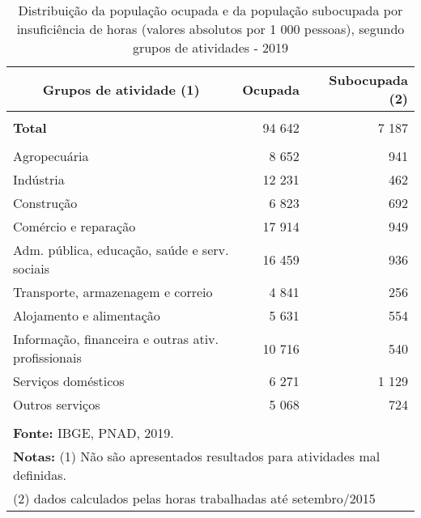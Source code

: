\documentclass[12pt]{article}   %
\begin{document}
	\begin{table}[h!]
		\centering
		\caption{Distribuição da população ocupada e da população subocupada por insuficiência de horas (valores absolutos por 1 000 pessoas), segundo grupos de atividades - 2019}
		\label{tab_ocup}
		\begin{tabular}{l|rr}
			\hline
			\multicolumn{1}{c|}{\textbf{Grupos de atividade (1)}}&\textbf{Ocupada}&\textbf{Subocupada (2)}\\
			\hline
			&&\\
			\textbf{Total}&94 642&7 187\\
			&&\\
			Agropecuária&8 652&941\\
			Indústria&12 231&462\\
			Construção&6 823&692\\
			Comércio e reparação&17 914&949\\
			Adm. pública, educação, saúde e serv. sociais&16 459&936\\
			Transporte, armazenagem e correio&4 841&256\\
			Alojamento e alimentação&5 631&554\\
			Informação, financeira e outras ativ. profissionais&10 716&540\\
			Serviços domésticos&6 271&1 129\\
			Outros serviços&5 068&724\\
			&&\\
			\hline
			\multicolumn{3}{l}{\textbf{Fonte:} IBGE, PNAD, 2019.}\\
			\multicolumn{3}{l}{\textbf{Notas:} (1) Não são apresentados resultados para atividades mal definidas.}\\
			\multicolumn{3}{l}{(2) dados calculados pelas horas trabalhadas até setembro/2015}\\
		\end{tabular}
	\end{table}
\end{document}
